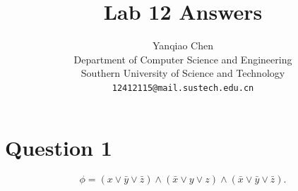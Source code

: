 \documentclass[a4paper, UTF-8]{article}
\theoremstyle{plain}
\begin{document}
\title{\bf{Lab 12 Answers}}
\author{Yanqiao Chen\\ 
  Department of Computer Science and Engineering\\
  Southern University of Science and Technology\\
  \texttt{12412115@mail.sustech.edu.cn}
  }
\maketitle

\section{Question 1} 

\[
  \phi=(x\vee \bar y\vee \bar z)\wedge(\bar x\vee y\vee z)\wedge
  (\bar x\vee \bar y\vee \bar z).
\]
\end{document}

